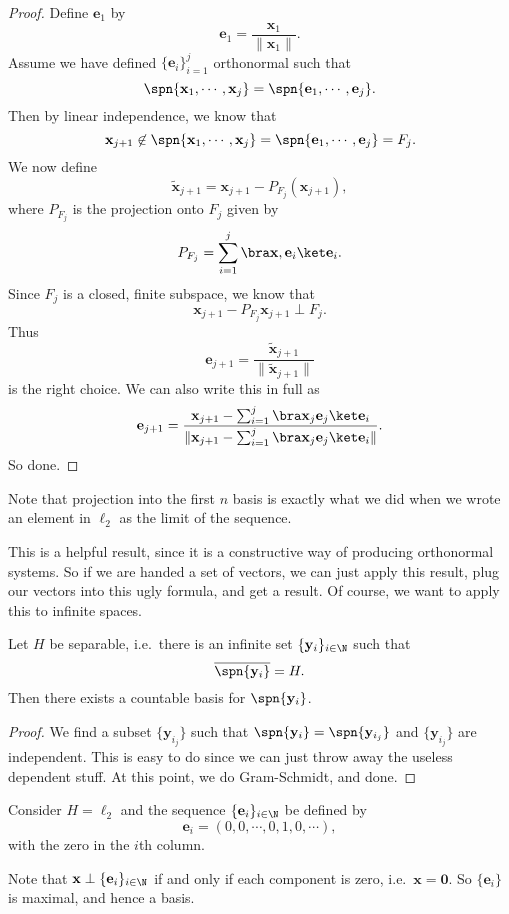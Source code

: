 \documentclass[a4paper]{article}
\begin{document}
\begin{proof}
  Define $\mathbf{e}_1$ by
  \[
    \mathbf{e}_1 = \frac{\mathbf{x}_1}{\|\mathbf{x}_1\|}.
  \]
  Assume we have defined $\{\mathbf{e}_i\}_{i = 1}^j$ orthonormal such that
  \[
    \spn\{\mathbf{x}_1, \cdots, \mathbf{x}_j\} = \spn\{\mathbf{e}_1, \cdots, \mathbf{e}_j\}.
  \]
  Then by linear independence, we know that
  \[
    \mathbf{x}_{j + 1} \not\in \spn\{\mathbf{x}_1, \cdots, \mathbf{x}_j\} = \spn\{\mathbf{e}_1, \cdots, \mathbf{e}_j\} = F_j.
  \]
  We now define
  \[
    \tilde{\mathbf{x}}_{j + 1} = \mathbf{x}_{j + 1} - P_{F_j}(\mathbf{x}_{j + 1}),
  \]
  where $P_{F_j}$ is the projection onto $F_j$ given by
  \[
    P_{F_j} = \sum_{i = 1}^j \bra \mathbf{x}, \mathbf{e}_i\ket \mathbf{e}_i.
  \]
  Since $F_j$ is a closed, finite subspace, we know that
  \[
    \mathbf{x}_{j + 1} - P_{F_j} \mathbf{x}_{j + 1} \perp F_j.
  \]
  Thus
  \[
    \mathbf{e}_{j + 1} = \frac{\tilde{\mathbf{x}}_{j + 1}}{\|\tilde{\mathbf{x}}_{j + 1}\|}
  \]
  is the right choice. We can also write this in full as
  \[
    \mathbf{e}_{j + 1} = \frac{\mathbf{x}_{j + 1} - \sum_{i = 1}^j \bra \mathbf{x}_j \mathbf{e}_j\ket \mathbf{e}_i}{\|\mathbf{x}_{j + 1} - \sum_{i = 1}^j \bra \mathbf{x}_j \mathbf{e}_j\ket \mathbf{e}_i\|}.
  \]
  So done.
\end{proof}
Note that projection into the first $n$ basis is exactly what we did when we wrote an element in $\ell_2$ as the limit of the sequence.

This is a helpful result, since it is a constructive way of producing orthonormal systems. So if we are handed a set of vectors, we can just apply this result, plug our vectors into this ugly formula, and get a result. Of course, we want to apply this to infinite spaces.

\begin{prop}
  Let $H$ be separable, i.e.\ there is an infinite set $\{\mathbf{y}_i\}_{i \in \N}$ such that
  \[
    \overline{\spn \{\mathbf{y}_i\}} = H.
  \]
  Then there exists a countable basis for $\spn \{\mathbf{y}_i\}$.
\end{prop}

\begin{proof}
  We find a subset $\{\mathbf{y}_{i_j}\}$ such that $\spn \{\mathbf{y}_i\} = \spn\{\mathbf{y}_{i_j}\}$ and $\{\mathbf{y}_{i_j}\}$ are independent. This is easy to do since we can just throw away the useless dependent stuff. At this point, we do Gram-Schmidt, and done.
\end{proof}

\begin{eg}
  Consider $H = \ell_2$ and the sequence $\{\mathbf{e}_i\}_{i \in \N}$ be defined by
  \[
    \mathbf{e}_i = (0, 0, \cdots, 0, 1, 0, \cdots),
  \]
  with the zero in the $i$th column.

  Note that $\mathbf{x} \perp \{\mathbf{e}_i\}_{i \in \N}$ if and only if each component is zero, i.e.\ $\mathbf{x} = \mathbf{0}$. So $\{\mathbf{e}_i\}$ is maximal, and hence a basis.
\end{eg}
\end{document}
